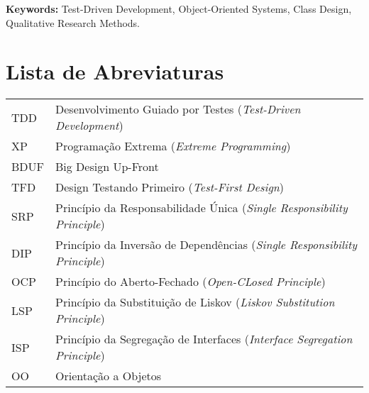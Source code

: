 \documentclass[11pt,twoside,a4paper]{book}
\begin{document}
\noindent \textbf{Keywords:} Test-Driven Development, Object-Oriented
Systems, Class Design, Qualitative Research Methods.

\tableofcontents    %

\chapter{Lista de Abreviaturas}
\begin{tabular}{ll}
         TDD         & Desenvolvimento Guiado por Testes (\emph{Test-Driven 
         Development})\\ 
         
         XP          & Programação Extrema (\emph{Extreme Programming})\\
		 
		 BDUF		 & Big Design Up-Front\\
		 
		 TFD         & Design Testando Primeiro (\emph{Test-First Design})\\
		 
		 SRP		 & Princípio da Responsabilidade Única (\emph{Single Responsibility
		 Principle})\\
		 
		 DIP		 & Princípio da Inversão de Dependências (\emph{Single Responsibility
		 Principle})\\ 
		 
		 OCP		 & Princípio do Aberto-Fechado (\emph{Open-CLosed Principle})\\
		 
		 LSP	 	 & Princípio da Substituição de Liskov (\emph{Liskov Substitution
		 Principle})\\
		 
		 ISP		 & Princípio da Segregação de Interfaces (\emph{Interface Segregation
		 Principle})\\
		 
		 OO		 	 & Orientação a Objetos
		 
\end{tabular}

\listoffigures            
\listoftables            

\mainmatter
\end{document}
